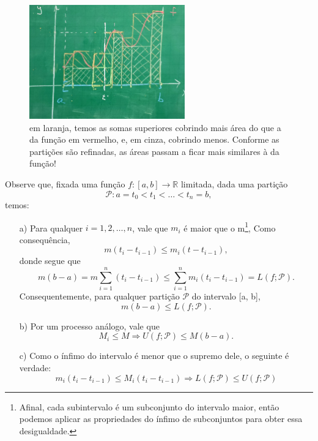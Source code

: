 \documentclass[../analysisII_notes.tex]{subfiles}
\begin{document}
\begin{figure}[H]
	\begin{center}
		\includegraphics[height=0.6\textheight, width=0.6\textwidth, keepaspectratio]{./Images/sums_03.png}
	\end{center}
	\caption{em laranja, temos as somas superiores cobrindo mais área do que a da função em vermelho, e, em cinza, cobrindo menos. Conforme as partições são refinadas, as áreas passam a ficar mais similares à da função!}
	\label{uisums03}
\end{figure}

Observe que, fixada uma função \(f:[a, b]\rightarrow \mathbb{R}\) limitada, dada uma partição
\[
	\mathcal{P}:a = t_{0} < t_1 < \dotsc < t_{n} = b,
\]
temos:
\begin{itemize}
	\item[a)] Para qualquer \(i = 1, 2, \dotsc, n\), vale que \(m_{i}\) é maior que o m\footnote{Afinal, cada subintervalo é um subconjunto do intervalo maior, então podemos aplicar as propriedades do ínfimo de subconjuntos para obter essa desigualdade.}, Como consequência,
	      \[
		      m(t_{i}-t_{i-1}) \leq m_{i}(t-t_{i-1}),
	      \]
	      donde segue que
	      \[
		      m(b-a) = m \sum\limits_{i=1}^{n}(t_{i} - t_{i-1}) \leq \sum\limits_{i=1}^{n}m_{i}(t_{i}-t_{i-1}) = L(f; \mathcal{P}).
	      \]
	      Consequentemente, para qualquer partição \(\mathcal{P}\) do intervalo [a, b],
	      \[
		      m(b-a)\leq L(f; \mathcal{P}).
	      \]
	\item[b)] Por um processo análogo, vale que
	      \[
		      M_{i}\leq M \Rightarrow U(f; \mathcal{P}) \leq M(b-a).
	      \]
	\item[c)] Como o ínfimo do intervalo é menor que o supremo dele, o seguinte é verdade:
	      \[
		      m_{i}(t_{i}-t_{i-1}) \leq M_{i}(t_{i}-t_{i-1}) \Rightarrow L(f; \mathcal{P})\leq U(f; \mathcal{P})
	      \]
\end{itemize}
\end{document}
